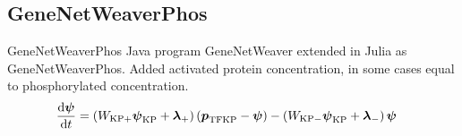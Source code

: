 \subsection{GeneNetWeaverPhos}
\begin{frame}{GeneNetWeaverPhos}
\label{sec:gnw_extension}
Java program GeneNetWeaver extended in Julia as GeneNetWeaverPhos. Added activated protein concentration, in some cases equal to phosphorylated concentration.
\begin{subequations}
\label{eq:gnw_kinase}
\begin{align}
\label{eq:dydt}
\dv{\boldsymbol{\psi}}{t} &= \left(W_{\text{KP}+} \boldsymbol{\psi}_\text{KP} + \boldsymbol{\lambda}_+\right) \left( \boldsymbol{p}_\text{TFKP} - \boldsymbol{\psi} \right) - \left(W_{\text{KP}-} \boldsymbol{\psi}_\text{KP} + \boldsymbol{\lambda}_- \right) \boldsymbol{\psi}
\end{align}
\end{subequations}

\end{frame}
